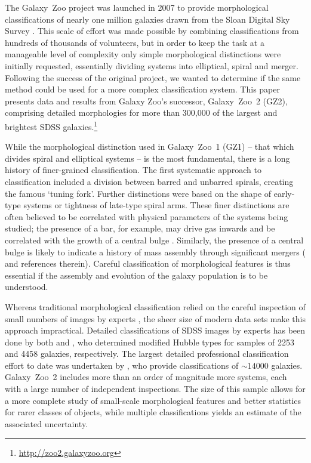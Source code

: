 \documentclass[useAMS,usenatbib]{mn2e}
\begin{document}
The Galaxy~Zoo project \citep{lin08} was launched in 2007 to provide morphological classifications of nearly one million galaxies drawn from the Sloan Digital Sky Survey \citep[SDSS;][]{yor00}. This scale of effort was made possible by combining classifications from hundreds of thousands of volunteers, but in order to keep the task at a manageable level of complexity only simple morphological distinctions were initially requested, essentially dividing systems into elliptical, spiral and merger. Following the success of the original project, we wanted to determine if the same method could be used for a more complex classification system. This paper presents data and results from Galaxy Zoo's successor, Galaxy~Zoo~2 (GZ2), comprising detailed morphologies for more than 300,000 of the largest and brightest SDSS galaxies.\footnote{\url{http://zoo2.galaxyzoo.org}}

While the morphological distinction used in Galaxy~Zoo~1 (GZ1) -- that which divides spiral and elliptical systems -- is the most fundamental, there is a long history of finer-grained classification. The first systematic approach to classification \citep{hub36} included a division between barred and unbarred spirals, creating the famous `tuning fork'. Further distinctions were based on the shape of early-type systems or tightness of late-type spiral arms. These finer distinctions are often believed to be correlated with physical parameters of the systems being studied; the presence of a bar, for example, may drive gas inwards and be correlated with the growth of a central bulge \citep[a review is given in \citealt{kor04} and an updated picture by][]{mas11c}. Similarly, the presence of a central bulge is likely to indicate a history of mass assembly through significant mergers (\citet{mar12} and references therein). Careful classification of morphological features is thus essential if the assembly and evolution of the galaxy population is to be understood.

Whereas traditional morphological classification relied on the careful inspection of small numbers of images by experts \citep[e.g., ][]{san61,dev91}, the sheer size of modern data sets make this approach impractical. Detailed classifications of SDSS images by experts has been done by both \citet{fuk07} and \citet{bai11}, who determined modified Hubble types for samples of 2253 and 4458 galaxies, respectively. The largest detailed professional classification effort to date was undertaken by \citet{nai10}, who provide classifications of $\sim14000$ galaxies. Galaxy~Zoo~2 includes more than an order of magnitude more systems, each with a large number of independent inspections. The size of this sample allows for a more complete study of small-scale morphological features and better statistics for rarer classes of objects, while multiple classifications yields an estimate of the associated uncertainty. 
\end{document}

